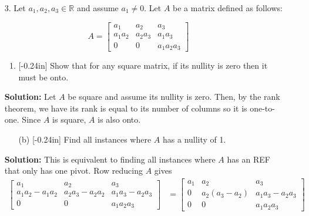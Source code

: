 \documentclass[letterpaper,12pt]{article}
\theoremstyle{definition}
\begin{document}
\newpage
\begin{enumerate}
     \item[3.] Let $a_1,a_2,a_3 \in \mathbb{R}$ and assume $a_1 \neq 0$. Let $A$ be a matrix defined as follows: 
 \end{enumerate}   
    $$A = \begin{bmatrix}
         a_1 & a_2 & a_3  \\
          a_1a_2 & a_2a_3 & a_1a_3 \\
         0 & 0 & a_1a_2a_3
     \end{bmatrix}$$
\begin{enumerate}
     \item[] \begin{enumerate}
         \item \reversemarginpar{}[-0.24in] Show that for any square matrix, if its nullity is zero then it must be onto.
         \end{enumerate}
         \begin{mdframed}
             \textbf{Solution:} Let $A$ be square and assume its nullity is zero. Then, by the rank theorem, we have its rank is equal to its number of columns so it is one-to-one. Since $A$ is square, $A$ is also onto.
         \end{mdframed}
         \vspace{0.7in}
         \begin{enumerate}
         \item[(b)] \reversemarginpar{}[-0.24in] Find all instances where $A$ has a nullity of 1.
     \end{enumerate}
      \begin{mdframed}
             \textbf{Solution:} This is equivalent to finding all instances where $A$ has an REF that only has one pivot. Row reducing $A$ gives
             \begin{align*}\begin{bmatrix}
         a_1 & a_2 & a_3  \\
          a_1a_2 - a_1a_2 & a_2a_3 - a_2a_2 & a_1a_3 - a_2a_3\\
         0 & 0 & a_1a_2a_3
     \end{bmatrix} &= \begin{bmatrix}
         a_1 & a_2 & a_3  \\
          0 & a_2(a_3 - a_2) & a_1a_3 - a_2a_3\\
         0 & 0 & a_1a_2a_3
     \end{bmatrix}\end{align*}

\end{mdframed}
\end{enumerate}
\end{document}
